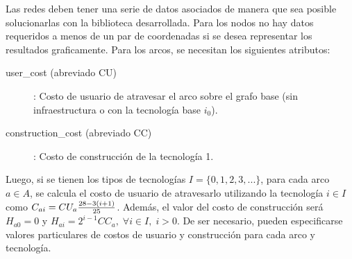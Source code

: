 Las redes deben tener una serie de datos asociados de manera que sea posible solucionarlas con la biblioteca desarrollada. Para los nodos no hay datos requeridos a menos de un par de coordenadas si se desea representar los resultados graficamente. Para los arcos, se necesitan los siguientes atributos:

\begin{description}
\item[user\_cost (abreviado CU)]: Costo de usuario de atravesar el arco sobre el grafo base (sin infraestructura o con la tecnología base $i_0$).
\item[construction\_cost (abreviado CC)]: Costo de construcción de la tecnología 1.
\end{description}

Luego, si se tienen los tipos de tecnologías $I = \{0, 1, 2, 3, ... \}$, para cada arco $a \in A$, se calcula el costo de usuario de atravesarlo utilizando la tecnología $i \in I$ como $C_{ai} = CU_a { 28 - 3 (i + 1) \over 25}$. Además, el valor del costo de construcción será $H_{a0} = 0$ y $H_{ai} = 2^{i-1} CC_a,\; \forall i\in I,\; i > 0$. De ser necesario, pueden especificarse valores particulares de costos de usuario y construcción para cada arco y tecnología.
